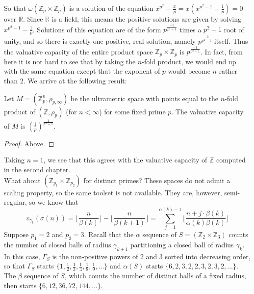 So that $\omega(\mathbb{Z}_p \times \mathbb{Z}_p)$ is a solution of the equation $x^{p^2} - \frac{x}{p} = x(x^{p^2-1} - \frac{1}{p})=0$ over $\mathbb{R}$. Since $\mathbb{R}$ is a field, this means the positive solutions are given by solving $x^{p^2-1}-\frac{1}{p}$. Solutions of this equation are of the form $p^{\frac{-1}{p^2-1}}$ times a $p^2-1$ root of unity, and so there is exactly one positive, real solution, namely $p^{\frac{-1}{p^2-1}}$ itself. Thus the valuative capacity of the entire product space $\mathbb{Z}_p \times \mathbb{Z}_p$ is $p^{\frac{-1}{p^2-1}}$. In fact, from here it is not hard to see that by taking the $n$-fold product, we would end up with the same equation except that the exponent of $p$ would become $n$ rather than $2$. We arrive at the following result:\\

\begin{proposition}
Let $M=(\mathbb{Z}_p^n, \rho_{p, \infty})$ be the ultrametric space with points equal to the $n$-fold product of $(\mathbb{Z}, \rho_p)$ (for $n < \infty$) for some fixed prime $p$. The valuative capacity of $M$ is  $(\frac{1}{p})^{\frac{1}{p^n-1}}$.
\end{proposition}

\begin{proof}
Above.
\end{proof}

Taking $n=1$, we see that this agrees with the valuative capacity of $\mathbb{Z}$ computed in the second chapter. \\

What about $(\mathbb{Z}_{p_1} \times \mathbb{Z}_{p_2})$ for distinct primes? These spaces do not admit a scaling property, so the same toolset is not available. They are, however, semi-regular, so we know that\\  \[v_{\gamma_k}(\sigma(n)) =  \lfloor\frac{n}{\beta(k)}\rfloor - \lfloor\frac{n}{\beta(k+1)}\rfloor = \sum_{j=1}^{\alpha(k)-1} \lfloor \frac{n + j\cdot \beta(k)}{\alpha(k)\beta(k)} \rfloor \]
Suppose $p_1 =2$ and $p_2 =3$. Recall that the $\alpha$ sequence of $S=(\mathbb{Z}_{2} \times \mathbb{Z}_{3})$ counts the number of closed balls of radius $\gamma_{k+1}$ partitioning a closed ball of radius $\gamma_k$. In this case, $\Gamma_S$ is the non-positive powers of $2$ and $3$ sorted into decreasing order, so that $\Gamma_S$ starts $\{1, \frac{1}{2},\frac{1}{3},\frac{1}{4},\frac{1}{8},\frac{1}{9},\ldots \}$ and $\alpha(S)$ starts $\{6,2,3,2,2,3,2,3,2,\ldots\}$. The $\beta$ sequence of $S$, which counts the number of distinct balls of a fixed radius, then starts $\{6,12,36,72,144,\ldots\}$.\\

